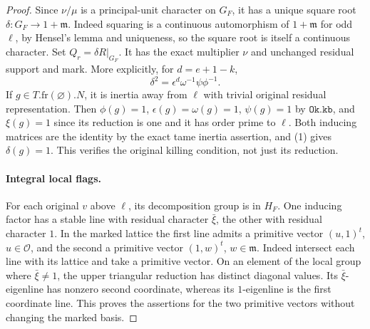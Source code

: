 \begin{proof}
Since \(\nu/\mu\) is a principal-unit character on \(G_F\),
it has a unique square root \(\delta:G_F\to1+\mathfrak m\).
Indeed squaring is a continuous automorphism of \(1+\mathfrak m\)
for odd \(\ell\), by Hensel's lemma and uniqueness, so the
square root is itself a continuous character. Set
\(Q_r=\delta R|_{G_F}\). It has the exact multiplier \(\nu\)
and unchanged residual support and mark. More explicitly, for
\(d=e+1-k\),
\[
 \delta^2=\epsilon^d\omega^{-1}\psi\phi^{-1}.
 \tag{1}\label{eq:seed-II-twist}
\]
If \(g\in T.\mathrm{fr}(\varnothing).N\), it is inertia away
from \(\ell\) with trivial original residual representation.
Then \(\phi(g)=1\), \(\epsilon(g)=\omega(g)=1\),
\(\psi(g)=1\) by \(\texttt{Ok.kb}\), and \(\xi(g)=1\)
since its reduction is one and it has order prime to \(\ell\).
Both inducing matrices are the identity by the exact tame
inertia assertion, and (1) gives \(\delta(g)=1\).
This verifies the original killing condition, not just its reduction.

\paragraph{Integral local flags.}
For each original \(v\) above \(\ell\), its decomposition group
is in \(H_F\). One inducing factor has a stable line with
residual character \(\bar\xi\), the other with residual
character \(1\). In the marked lattice the first line admits
a primitive vector \((u,1)^t\), \(u\in\mathcal O\), and the
second a primitive vector \((1,w)^t\), \(w\in\mathfrak m\).
Indeed intersect each line with its lattice and take a primitive
vector. On an element of the local group where \(\bar\xi\ne1\),
the upper triangular reduction has distinct diagonal values.
Its \(\bar\xi\)-eigenline has nonzero second coordinate,
whereas its \(1\)-eigenline is the first coordinate line.
This proves the assertions for the two primitive vectors
without changing the marked basis.


\end{proof}
